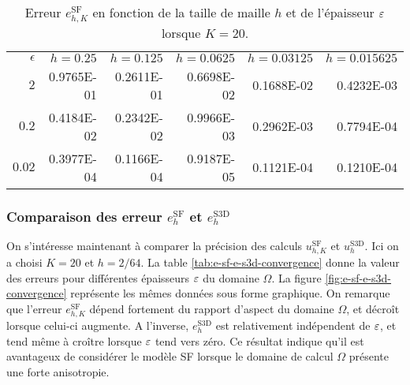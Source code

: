 \begin{table}[h!]
  \caption{Erreur $e_{h,K}^\mathrm{SF}$ en fonction de la taille de
    maille $h$ et de l'épaisseur $\varepsilon$ lorsque $K = 20$.}
  \label{tab:n-h-convergence}
  \begin{center}
    \begin{tabular}{@{}rrrrrr@{}}
      \toprule
      $\epsilon$ & $h = 0.25$ & $h = 0.125$ & $h = 0.0625$ & $h = 0.03125$ & $h = 0.015625$ \\
      \cmidrule{1-6}
      $2$      & \num{0.9765E-01} & \num{0.2611E-01} & \num{0.6698E-02} & \num{0.1688E-02} & \num{0.4232E-03} \\
      $0.2$    & \num{0.4184E-02} & \num{0.2342E-02} & \num{0.9966E-03} & \num{0.2962E-03} & \num{0.7794E-04} \\
      $0.02$   & \num{0.3977E-04} & \num{0.1166E-04} & \num{0.9187E-05} & \num{0.1121E-04} & \num{0.1210E-04} \\
      \bottomrule
    \end{tabular}
  \end{center}
\end{table}

\subsubsection{Comparaison des erreur $e_h^{\mathrm{SF}}$ et
  $e_h^{\mathrm{S3D}}$} On s'intéresse maintenant à comparer la
précision des calculs $u_{h,K}^\mathrm{SF}$ et
$u_h^{\mathrm{S3D}}$. Ici on a choisi $K = 20$ et $h = 2/64$. La table
\ref{tab:e-sf-e-s3d-convergence} donne la valeur des erreurs pour
différentes épaisseurs $\varepsilon$ du domaine $\Omega$. La figure
\ref{fig:e-sf-e-s3d-convergence} représente les mêmes données sous
forme graphique. On remarque que l'erreur $e_{h,K}^\mathrm{SF}$
dépend fortement du rapport d'aspect du domaine $\Omega$, et
décroît lorsque celui-ci augmente. A l'inverse, $e_h^\mathrm{S3D}$ est
relativement indépendent de $\varepsilon$, et tend même à croître
lorsque $\varepsilon$ tend vers zéro. Ce résultat indique qu'il est
avantageux de considérer le modèle SF lorsque le domaine de calcul
$\Omega$ présente une forte anisotropie.

